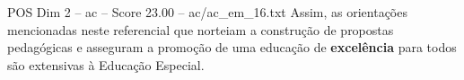 \begin{textsample}{POS Dim 2 – ac – Score 23.00 – ac/ac\_em\_16.txt}
Assim, as orientações mencionadas neste referencial que norteiam a construção de propostas pedagógicas e asseguram a promoção de uma educação de \textbf{excelência} para todos são extensivas à Educação Especial.

\end{textsample}
